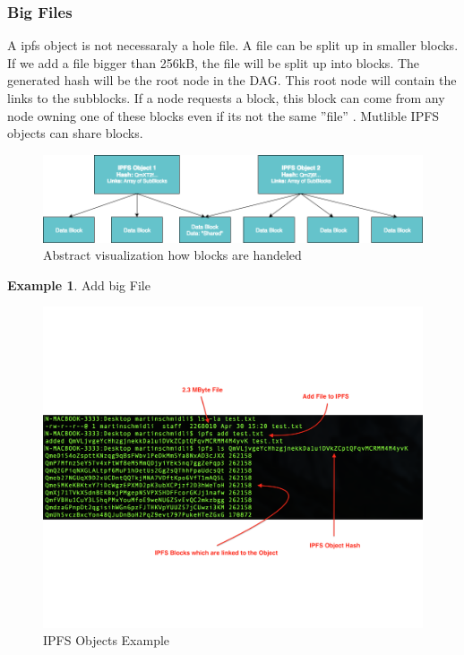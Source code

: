 \documentclass[a4paper,11pt, oneside]{report}
\theoremstyle{definition}
\newtheorem{exmp}{Example}[subsection]
\begin{document}
\subsubsection{Big Files}
A ipfs object is not necessaraly a hole file. A file can be split up in smaller blocks. If we add a file bigger than 256kB, the file will be split up into blocks. The generated hash will be the root node in the DAG. This root node will contain the links to the subblocks. If a node requests a block, this block can come from any node owning one of these blocks even if its not the same ''file'' \cite{fileblock}. Mutlible IPFS objects can share blocks.
\begin{figure}[H]
\centering
\includegraphics[width=\textwidth]{img/ipfs-fileblocks.png}
\caption[Objects \& Blocks]{Abstract visualization how blocks are handeled}
\end{figure}
\begin{exmp}Add big File\\
\begin{figure}[H]
\centering
\includegraphics[width=\textwidth]{img/ipfs-object-example.png}
\caption[IPFS Objects Example]{IPFS Objects Example}
\end{figure}
\end{exmp}
\end{document}
